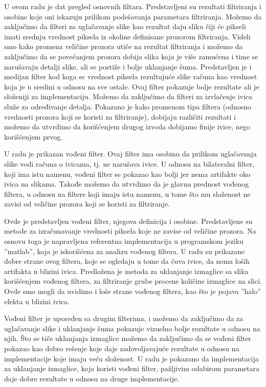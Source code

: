 \documentclass[a4paper,12pt,titlepage]{article}
\begin{document}
U ovom radu je dat pregled osnovnih filtara. Predstavljeni su rezultati filtriranja i osobine koje oni iskazuju prilikom podešavanja parametara filtriranja. Možemo da zaključimo da filteri za uglačavanje slike kao rezultat daju sliku čiji će pikseli imati srednju vrednost piksela iz okoline definisane prozorom filtriranja. Videli smo kako promena veličine prozora utiče na rezultat filtriranja i možemo da zaključimo da se povećanjem prozora dobija slika koja je više zamućena i time se narušavaju detalji slike, ali se postiže i bolje uklanjanje šuma. Predstavljen je i medijan filter kod koga se vrednost piksela rezultujuće slike računa kao vrednost koja je u sredini u odnosu na sve ostale. Ovaj filter pokazuje bolje rezultate ali je složeniji za implementaciju. Možemo da zaključimo da filteri za izvlačenje ivica služe za određivanje detalja. Pokazano je kako promenom tipa filtera (odnosno vrednosti prozora koji se koristi za filtriranje), dobijaju različiti rezultati i možemo da utvrdimo da korišćenjem drugog izvoda dobijamo finije ivice, nego korišćenjem prvog.

U radu je prikazan vođeni filter. Ovaj filter ima osobinu da prilikom uglačavanja slike vodi računa o ivicama, tj. ne narušava ivice. U odnosu na bilateralni filter, koji ima istu namenu, vođeni filter se pokazao kao bolji jer nema artifakte oko ivica na slikama. Takođe možemo da utvrdimo da je glavna prednost vođenog filtera, u odnosu na filtere koji imaju istu namenu, u tome što mu složenost ne zavisi od veličine prozora koji se koristi za filtriranje. 

Ovde je predstavljen vođeni filter, njegova definicija i osobine. Predstavljene su metode za izračunavanje vrednosti piksela koje ne zavise od veličine prozora. Na osnovu toga je napravljena referentna implementacija u programskom jeziku ''matlab'', koja je iskorišćena za analizu vođenog filtera. U radu su prikazane dobre strane ovog filtera, koje se ogledaju u tome da čuva ivice, da nema loših artifakta u blizini ivica. Predložena je metoda za uklanjanje izmaglice sa slika korišćenjem vođenog filtera, za filtriranje grube procene količine izmaglice na slici. Ovde smo mogli da uvidimo i loše strane vođenog filtera, kao što je pojava ''halo'' efekta u blizini ivica. 

Vođeni filter je upoređen sa drugim filterima, i možemo da zaključimo da za uglačavanje slike i uklanjanje šuma pokazuje vizuelno bolje rezultate u odnosu na njih. Što se tiče uklanjanja izmaglice možemo da zaključimo da se vođeni filter pokazao kao dobro rešenje koje daje zadovoljavajuće rezultate u odnosu na implementacije koje imaju veću složenost. U radu je pokazano da implementacija za uklanjanje izmaglice, koja koristi vođeni filter, pažljivim odabirom parametara daje dobre rezultate u odnosu na druge implementacije.
\end{document}
